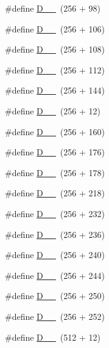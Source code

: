 \begin{DoxyCompactItemize}
\item 
\#define \hyperlink{group___d_r_i_v_e_r_s_gaa3060f343d69794f21fcb65974c135bd}{D\+\_\+\_}~(256 + 98)
\item 
\#define \hyperlink{group___d_r_i_v_e_r_s_ga1a90f348e71ec52d2ae6af1b56a513e6}{D\+\_\+\_}~(256 + 106)
\item 
\#define \hyperlink{group___d_r_i_v_e_r_s_ga0443e52a615f3203ebc5ca43189bdcb8}{D\+\_\+\_}~(256 + 108)
\item 
\#define \hyperlink{group___d_r_i_v_e_r_s_ga2c149c0691ea56561d9f3cd0f34bb1d9}{D\+\_\+\_}~(256 + 112)
\item 
\#define \hyperlink{group___d_r_i_v_e_r_s_ga782fd500c37614a9a83b50adf3f18a2d}{D\+\_\+\_}~(256 + 144)
\item 
\#define \hyperlink{group___d_r_i_v_e_r_s_ga3248b12d5c7a9f33e19f32da0822ce60}{D\+\_\+\_}~(256 + 12)
\item 
\#define \hyperlink{group___d_r_i_v_e_r_s_ga97169732d7858751120c9b32109f5875}{D\+\_\+\_}~(256 + 160)
\item 
\#define \hyperlink{group___d_r_i_v_e_r_s_gab7a349f836821460da79b4bbcb1089c2}{D\+\_\+\_}~(256 + 176)
\item 
\#define \hyperlink{group___d_r_i_v_e_r_s_ga783f9fddb57c3462c7d4344c46cbec51}{D\+\_\+\_}~(256 + 178)
\item 
\#define \hyperlink{group___d_r_i_v_e_r_s_ga0c4568c70e2cd501e8de6c3147eb0276}{D\+\_\+\_}~(256 + 218)
\item 
\#define \hyperlink{group___d_r_i_v_e_r_s_ga2b58e015c2162382339b7c57607ee32c}{D\+\_\+\_}~(256 + 232)
\item 
\#define \hyperlink{group___d_r_i_v_e_r_s_ga1ac208ac9e1ba17e8b116176c2878068}{D\+\_\+\_}~(256 + 236)
\item 
\#define \hyperlink{group___d_r_i_v_e_r_s_ga9156998202039a8904e4733bd37faf4e}{D\+\_\+\_}~(256 + 240)
\item 
\#define \hyperlink{group___d_r_i_v_e_r_s_gaa65adef1ba1e6fd197e3058089c559fb}{D\+\_\+\_}~(256 + 244)
\item 
\#define \hyperlink{group___d_r_i_v_e_r_s_gab5988bd1329cb108a57a5e81ecd2c26b}{D\+\_\+\_}~(256 + 250)
\item 
\#define \hyperlink{group___d_r_i_v_e_r_s_ga0f11a9f42b3d13434b8a62aefd077912}{D\+\_\+\_}~(256 + 252)
\item 
\#define \hyperlink{group___d_r_i_v_e_r_s_ga57d4674cf7793419f7dfa54606c73bf2}{D\+\_\+\_}~(512 + 12)

\end{DoxyCompactItemize}
